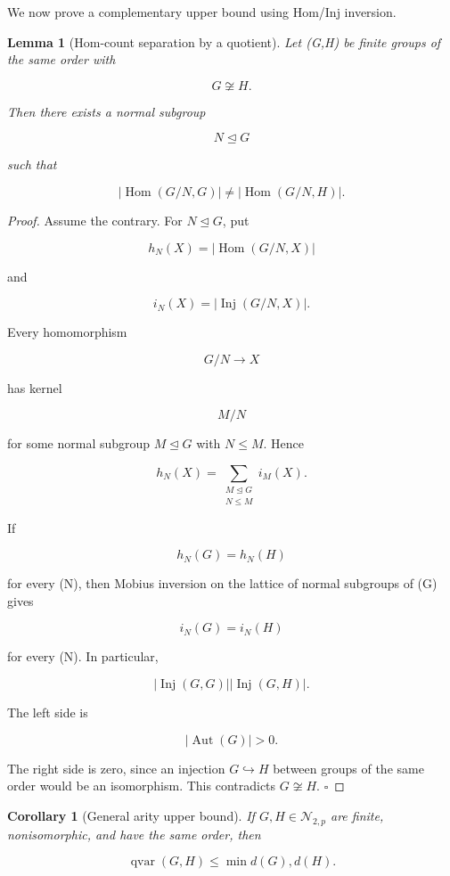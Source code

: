 \documentclass[11pt]{article}
\newtheorem{lemma}[theorem]{Lemma}
\newtheorem{corollary}[theorem]{Corollary}
\begin{document}
We now prove a complementary upper bound using Hom/Inj inversion.

\begin{lemma}[Hom-count separation by a quotient]
Let (G,H) be finite groups of the same order with

\[
G\not\cong H.
\]

Then there exists a normal subgroup

\[
N\trianglelefteq G
\]

such that

\[
|\operatorname{Hom}(G/N,G)|
\ne
|\operatorname{Hom}(G/N,H)|.
\]

\end{lemma}

\begin{proof}
Assume the contrary. For $N\trianglelefteq G$, put

\[
h_N(X)=|\operatorname{Hom}(G/N,X)|
\]

and

\[
i_N(X)=|\operatorname{Inj}(G/N,X)|.
\]

Every homomorphism

\[
G/N\to X
\]

has kernel

\[
M/N
\]

for some normal subgroup $M\trianglelefteq G$ with $N\le M$. Hence

\[
h_N(X)
=
\sum_{\substack{M\trianglelefteq G\\ N\le M}}
i_M(X).
\]

If

\[
h_N(G)=h_N(H)
\]

for every (N), then Mobius inversion on the lattice of normal subgroups of (G) gives

\[
i_N(G)=i_N(H)
\]

for every (N). In particular,

\[
|\operatorname{Inj}(G,G)|
|\operatorname{Inj}(G,H)|.
\]

The left side is

\[
|\operatorname{Aut}(G)|>0.
\]

The right side is zero, since an injection $G\hookrightarrow H$ between groups of the same order would be an isomorphism. This contradicts $G\not\cong H$. $\square$

\end{proof}

\begin{corollary}[General arity upper bound]
If $G,H\in\mathcal N_{2,p}$ are finite, nonisomorphic, and have the same order, then

\[
\operatorname{qvar}(G,H)
\le
\min{d(G),d(H)}.
\]

\end{corollary}
\end{document}
